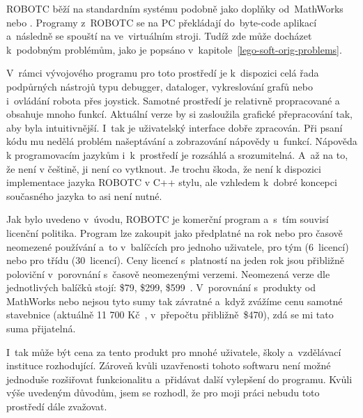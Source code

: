 
ROBOTC běží na standardním \lego{} systému podobně jako doplňky od~MathWorks nebo \NI{}.
Programy z~ROBOTC se na PC překládají do~byte-code aplikací a~následně se spouští na  ve~virtuálním stroji. 
Tudíž zde může docházet k~podobným problémům, jako je popsáno v~kapitole~\ref{lego-soft-orig-problems}.

V~rámci vývojového programu pro toto prostředí je k~dispozici celá řada podpůrných nástrojů typu debugger, dataloger, vykreslování grafů nebo i~ovládání robota přes joystick.
Samotné prostředí je relativně propracované a obsahuje mnoho funkcí. 
Aktuální verze by si zasloužila grafické přepracování tak, aby byla intuitivnější. 
I~tak je uživatelský interface dobře zpracován. 
Při psaní kódu mu nedělá problém našeptávání a zobrazování nápovědy u~funkcí.
Nápověda k programovacím jazykům i~k~prostředí je rozsáhlá a srozumitelná. 
A~až na to, že není v češtině, ji není co vytknout. %
Je trochu škoda, že není k dispozici implementace jazyka ROBOTC v C++ stylu, ale vzhledem k~dobré koncepci současného jazyka to asi není nutné. 

Jak bylo uvedeno v~úvodu, ROBOTC je komerční program a~s~tím souvisí licenční politika. 
Program lze zakoupit jako předplatné na rok nebo pro časově neomezené používání a~to v~balíčcích pro jednoho uživatele, pro tým (6~licencí) nebo pro třídu (30~licencí). 
Ceny licencí s~platností na jeden rok jsou přibližně poloviční v~porovnání s~časově neomezenými verzemi.
Neomezená verze dle jednotlivých balíčků stojí: \$79, \$299, \$599~\cite{legoProgramingPlatform_ROBOTC-price}.  
% 
% 
%
%
%
%
% 
% 
V~porovnání s~produkty od MathWorks nebo \NI{} nejsou tyto sumy tak závratné a~když zvážíme cenu samotné stavebnice \legoEV{} (aktuálně 11 700 Kč~\cite{lego_eduxeEshop_CoreSet}, v~přepočtu přibližně~\$470), zdá se mi tato suma přijatelná.

I~tak může být cena za tento produkt pro mnohé uživatele, školy a~vzdělávací instituce rozhodující.
Zároveň kvůli uzavřenosti tohoto softwaru není možné jednoduše rozšiřovat funkcionalitu a~přidávat další vylepšení do programu. 
Kvůli výše uvedeným důvodům, jsem se rozhodl, že pro moji práci nebudu toto prostředí dále zvažovat.	


